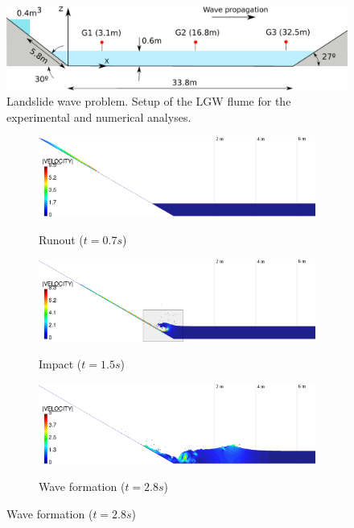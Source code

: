 \begin{figure} [htb]
    \centering
    \includegraphics[width=\textwidth]{img/coupling/landslide_wave_channel.pdf}
    \caption{Landslide wave problem. Setup of the LGW flume for the experimental and numerical analyses.}
    \label{landslide_wave_channel}
\end{figure}



\begin{figure}[p]
    \def\imgoffset{15ex}
    \centering
    \begin{subfigure}[c]{\columnwidth}
        \caption{Runout ($t=0.7s$)}
        \centering
        \includegraphics[width=\columnwidth]{img/coupling/t07.png}
        \label{t07pfemTest2}
    \end{subfigure}

    \begin{subfigure}[c]{\columnwidth}
        \caption{Impact ($t=1.5s$)}
        \centering
        \includegraphics[width=\columnwidth]{img/coupling/t15.png}
        \label{t15pfemTest2}
    \end{subfigure}

    \begin{subfigure}[c]{\columnwidth}
        \centering
        \caption{Wave formation ($t=2.8s$)}
        \includegraphics[width=\columnwidth]{img/coupling/t28.png}
        \label{t28pfemTest2}
    \end{subfigure}


\end{figure}
